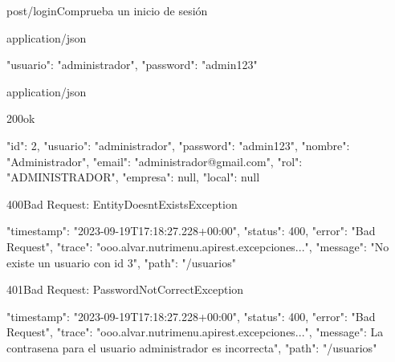 \begin{apiRoute}{post}{/login}{Comprueba un inicio de sesión}	
	\begin{routeRequest}{application/json}
		\begin{routeRequestBody}
{
    "usuario": "administrador",
    "password": "admin123"
}
		\end{routeRequestBody}
	\end{routeRequest}
	\begin{routeResponse}{application/json}
		\begin{routeResponseItem}{200}{ok}
			\begin{routeResponseItemBody}
{
    "id": 2,
    "usuario": "administrador",
    "password": "admin123",
    "nombre": "Administrador",
    "email": "administrador@gmail.com",
    "rol": "ADMINISTRADOR",
    "empresa": null,
    "local": null
}
			\end{routeResponseItemBody}
		\end{routeResponseItem}
		\begin{routeResponseItem}{400}{Bad Request: EntityDoesntExistsException}
			\begin{routeResponseItemBody}
{
    "timestamp": "2023-09-19T17:18:27.228+00:00",
    "status": 400,
    "error": "Bad Request",
    "trace": "ooo.alvar.nutrimenu.apirest.excepciones...",
    "message": "No existe un usuario con id 3",
    "path": "/usuarios"
}
			\end{routeResponseItemBody}
		\end{routeResponseItem}
		\begin{routeResponseItem}{401}{Bad Request: PasswordNotCorrectException}
			\begin{routeResponseItemBody}
{
    "timestamp": "2023-09-19T17:18:27.228+00:00",
    "status": 400,
    "error": "Bad Request",
    "trace": "ooo.alvar.nutrimenu.apirest.excepciones...",
    "message": La contrasena para el usuario administrador es incorrecta",
    "path": "/usuarios"
}
			\end{routeResponseItemBody}
		\end{routeResponseItem}
	\end{routeResponse}
\end{apiRoute}

